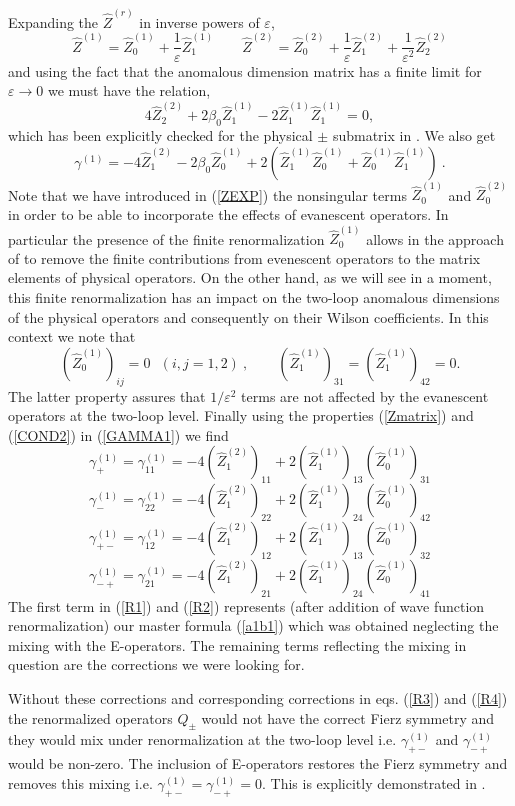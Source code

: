 \documentclass[12pt,rotate]{article}
\newcommand{\be}{\begin{equation}}
\newcommand{\ee}{\end{equation}}
\begin{document}
\begin{itemize}
\begin{itemize}
 Expanding the $\hat Z^{(r)}$ in inverse powers of $\varepsilon$,
\be\label{ZEXP}
\hat Z^{(1)}= \hat Z_0^{(1)}+\frac{1}{\varepsilon} \hat Z_1^{(1)}
\quad\quad
\hat Z^{(2)}= \hat Z_0^{(2)}+\frac{1}{\varepsilon} \hat Z_1^{(2)}
+\frac{1}{\varepsilon^2} \hat Z_2^{(2)}
\ee
 and using the fact that the anomalous dimension
 matrix has a finite limit for
 $\varepsilon \rightarrow 0$
 we must have the relation,
\be\label{COND}
4 \hat Z^{(2)}_{2} + 2\beta_{0} \hat Z^{(1)}_{1} - 
2 \hat Z^{(1)}_{1} \hat Z^{(1)}_{1}=0,
\ee
 which has been explicitly checked for the physical $\pm$ submatrix
in \cite{WEISZ}.
We also get
\be\label{GAMMA1}
\gamma^{(1)}=-4 \hat Z^{(2)}_1-2\beta_0 \hat Z^{(1)}_0
   + 2 (\hat Z^{(1)}_1 \hat Z^{(1)}_0+\hat Z^{(1)}_0 \hat Z^{(1)}_1)~.
\ee
Note that we have introduced in (\ref{ZEXP}) the nonsingular terms 
$\hat Z_0^{(1)}$ and $\hat Z_0^{(2)}$ in order to be able to incorporate
the effects of evanescent operators.
In particular the presence of the finite renormalization $\hat Z_0^{(1)}$
allows in the approach of \cite{WEISZ} to remove the finite contributions
from evenescent operators to the matrix elements of physical operators.
On the other hand, as we will see in a moment, this finite renormalization
has an impact on the two-loop anomalous dimensions of the physical operators
and consequently on their Wilson coefficients.
In this  context we note that
\be\label{COND2}
 (\hat Z^{(1)}_0)_{ij} = 0~~~(i,j=1,2)~,
\quad\quad
   (\hat Z^{(1)}_{1})_{3 1} = (\hat Z^{(1)}_{1})_{4 2} = 0.
\ee
The latter property assures that $1/\varepsilon^2$ terms are not
affected by the evanescent operators at the two-loop level.
Finally using the properties (\ref{Zmatrix}) and (\ref{COND2}) in 
(\ref{GAMMA1})
we find
\be\label{R1}
 \gamma^{(1)}_{+}=\gamma^{(1)}_{11}=
   -4(\hat Z^{(2)}_1)_{11}+2(\hat Z^{(1)}_1)_{13}(\hat Z^{(1)}_0)_{31}
\ee
\be\label{R2}
 \gamma^{(1)}_{-}=\gamma^{(1)}_{22}=
   -4(\hat Z^{(2)}_1)_{22}+2(\hat Z^{(1)}_1)_{24}(\hat Z^{(1)}_0)_{42}
\ee
\be\label{R3}
\gamma^{(1)}_{+-}=\gamma^{(1)}_{12}=
   -4(\hat Z^{(2)}_1)_{12}+2(\hat Z^{(1)}_1)_{13}(\hat Z^{(1)}_0)_{32}
\ee
\be\label{R4}
\gamma^{(1)}_{-+}=\gamma^{(1)}_{21}=
   -4(\hat Z^{(2)}_1)_{21}+2(\hat Z^{(1)}_1)_{24}(\hat Z^{(1)}_0)_{41}
\ee
 The first term in  (\ref{R1}) and (\ref{R2}) 
represents (after addition of wave function renormalization)
 our master formula (\ref{a1b1}) 
which was obtained neglecting the mixing with the E-operators.
 The remaining 
terms reflecting the mixing in question are the corrections we
 were looking for.

Without these corrections and corresponding corrections
 in eqs. (\ref{R3}) and (\ref{R4}) the renormalized operators $Q_\pm$
would not have  the correct Fierz symmetry 
and they would mix under renormalization at the two-loop level
 i.e. $\gamma^{(1)}_{+-}$ and $\gamma^{(1)}_{-+}$ 
would be non-zero. The inclusion of E-operators restores the
 Fierz symmetry and removes this mixing i.e.
 $ \gamma^{(1)}_{+-}=\gamma^{(1)}_{-+}=0$. This is explicitly
demonstrated in \cite{WEISZ}.


\end{itemize}
\end{itemize}
\end{document}
